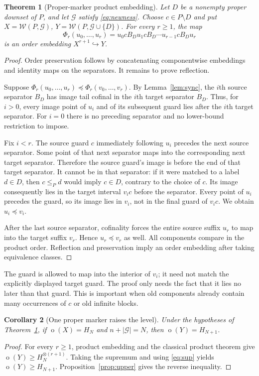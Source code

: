 \documentclass[11pt,a4paper]{article}
\numberwithin{equation}{section}
\newtheorem{theorem}{Theorem}[section]
\newtheorem{corollary}[theorem]{Corollary}
\theoremstyle{definition}
\theoremstyle{remark}
\newcommand{\mot}{\mathop{o}}
\newcommand{\W}{\mathcal W}
\newcommand{\G}{\mathcal G}
\newcommand{\emb}{\preccurlyeq}
\begin{document}
\begin{theorem}[Proper-marker product embedding]\label{thm:proper}
Let $D$ be a nonempty proper downset of $P$, and let $\G$ satisfy
\eqref{eq:newness}. Choose $c\in P\setminus D$ and put
$X=\W(P,\G)$, $Y=\W(P,\G\cup\{D\})$. For every $r\ge1$, the map
\begin{equation}\label{eq:propermap}
 \Phi_r(u_0,\ldots,u_r)
   =u_0cB_Du_1cB_D\cdots u_{r-1}cB_Du_r
\end{equation}
is an order embedding $X^{r+1}\hookrightarrow Y$.
\end{theorem}
\begin{proof}
Order preservation follows by concatenating componentwise embeddings and
identity maps on the separators. It remains to prove reflection.

Suppose $\Phi_r(u_0,\ldots,u_r)\emb\Phi_r(v_0,\ldots,v_r)$.
By Lemma~\ref{lem:sync}, the $i$th source separator $B_D$ has image tail
cofinal in the $i$th target separator $B_D$. Thus, for $i>0$, every image
point of $u_i$ and of its subsequent guard lies after the $i$th target
separator. For $i=0$ there is no preceding separator and no lower-bound
restriction to impose.

Fix $i<r$. The source guard $c$ immediately following $u_i$ precedes the
next source separator. Some point of that next separator maps into the
corresponding next target separator. Therefore the source guard's image
is before the end of that target separator. It cannot be in that separator:
if it were matched to a label $d\in D$, then $c\le_P d$ would imply
$c\in D$, contrary to the choice of $c$. Its image consequently lies in
the target interval $v_ic$ before the separator. Every point of $u_i$
precedes the guard, so its image lies in $v_i$, not in the final guard of
$v_ic$. We obtain $u_i\emb v_i$.

After the last source separator, cofinality forces the entire source
suffix $u_r$ to map into the target suffix $v_r$. Hence $u_r\emb v_r$ as
well. All components compare in the product order. Reflection and
preservation imply an order embedding after taking equivalence classes.
\end{proof}

The guard is allowed to map into the interior of $v_i$; it need not match
the explicitly displayed target guard. The proof only needs the fact that
it lies no later than that guard. This is important when old components
already contain many occurrences of $c$ or old infinite blocks.

\begin{corollary}[One proper marker raises the level]\label{cor:properlevel}
Under the hypotheses of Theorem~\ref{thm:proper}, if
$\mot(X)=H_N$ and $n+|\G|=N$, then $\mot(Y)=H_{N+1}$.
\end{corollary}
\begin{proof}
For every $r\ge1$, product embedding and the classical product theorem give
$\mot(Y)\ge H_N^{\otimes(r+1)}$. Taking the supremum and using
\eqref{eq:sup} yields $\mot(Y)\ge H_{N+1}$. Proposition~\ref{prop:upper}
gives the reverse inequality.
\end{proof}
\end{document}
